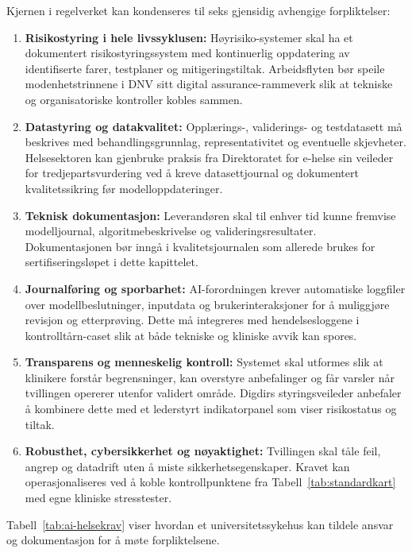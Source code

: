 Kjernen i regelverket kan kondenseres til seks gjensidig avhengige forpliktelser:
\begin{enumerate}
    \item \textbf{Risikostyring i hele livssyklusen:} Høyrisiko-systemer skal ha et dokumentert risikostyringssystem med kontinuerlig oppdatering av identifiserte farer, testplaner og mitigeringstiltak.\citep{eu2024aiact} Arbeidsflyten bør speile modenhetstrinnene i DNV sitt digital assurance-rammeverk slik at tekniske og organisatoriske kontroller kobles sammen.\citep{dnv2023digitalassurance}
    \item \textbf{Datastyring og datakvalitet:} Opplærings-, validerings- og testdatasett må beskrives med behandlingsgrunnlag, representativitet og eventuelle skjevheter.\citep{eu2024aiact} Helsesektoren kan gjenbruke praksis fra Direktoratet for e-helse sin veileder for tredjepartsvurdering ved å kreve datasettjournal og dokumentert kvalitetssikring før modelloppdateringer.\citep{ehelse2024tilsyn}
    \item \textbf{Teknisk dokumentasjon:} Leverandøren skal til enhver tid kunne fremvise modelljournal, algoritmebeskrivelse og valideringsresultater.\citep{eu2024aiact} Dokumentasjonen bør inngå i kvalitetsjournalen som allerede brukes for sertifiseringsløpet i dette kapittelet.
    \item \textbf{Journalføring og sporbarhet:} AI-forordningen krever automatiske loggfiler over modellbeslutninger, inputdata og brukerinteraksjoner for å muliggjøre revisjon og etterprøving.\citep{eu2024aiact} Dette må integreres med hendelsesloggene i kontrolltårn-caset slik at både tekniske og kliniske avvik kan spores.
    \item \textbf{Transparens og menneskelig kontroll:} Systemet skal utformes slik at klinikere forstår begrensninger, kan overstyre anbefalinger og får varsler når tvillingen opererer utenfor validert område.\citep{eu2024aiact} Digdirs styringsveileder anbefaler å kombinere dette med et lederstyrt indikatorpanel som viser risikostatus og tiltak.\citep{digdir2023styringai}
    \item \textbf{Robusthet, cybersikkerhet og nøyaktighet:} Tvillingen skal tåle feil, angrep og datadrift uten å miste sikkerhetsegenskaper.\citep{eu2024aiact} Kravet kan operasjonaliseres ved å koble kontrollpunktene fra Tabell~\ref{tab:standardkart} med egne kliniske stresstester.
\end{enumerate}

Tabell~\ref{tab:ai-helsekrav} viser hvordan et universitetssykehus kan tildele ansvar og dokumentasjon for å møte forpliktelsene.

